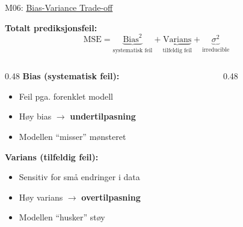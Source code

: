 \documentclass[aspectratio=169, 10pt]{beamer}
\begin{document}
\begin{frame}{M06: \href{https://en.wikipedia.org/wiki/Bias\%E2\%80\%93variance_tradeoff}{Bias-Variance Trade-off}}

    \textbf{Totalt prediksjonsfeil:}
    \[ \text{MSE} = \underbrace{\text{Bias}^2}_{\text{systematisk feil}} + \underbrace{\text{Varians}}_{\text{tilfeldig feil}} + \underbrace{\sigma^2}_{\text{irreducible}} \]

    \vspace{1mm}
    \begin{columns}
        \begin{column}{0.48\textwidth}
            \textbf{Bias (systematisk feil):}
            \begin{itemize}
                \item Feil pga. forenklet modell
                \item Høy bias $\rightarrow$ \textbf{undertilpasning}
                \item Modellen ``misser'' mønsteret
            \end{itemize}

            \vspace{2mm}
            \textbf{Varians (tilfeldig feil):}
            \begin{itemize}
                \item Sensitiv for små endringer i data
                \item Høy varians $\rightarrow$ \textbf{overtilpasning}
                \item Modellen ``husker'' støy
            \end{itemize}
        \end{column}

        \begin{column}{0.48\textwidth}
            \begin{center}
\end{center}
\end{column}
\end{columns}
\end{frame}
\end{document}
